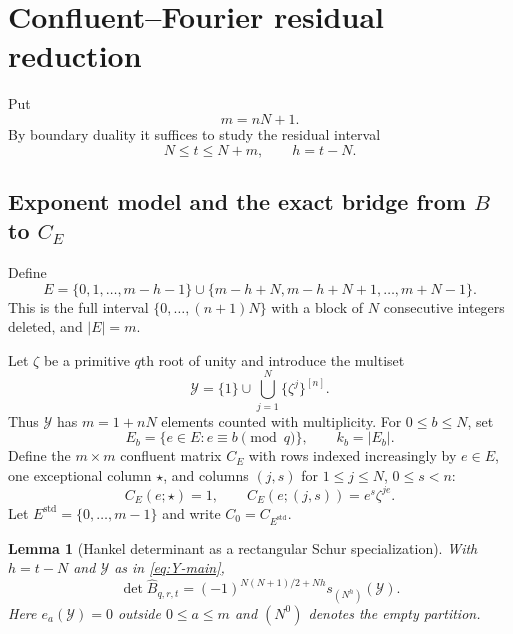 \documentclass[11pt]{amsart}
\newcommand{\cB}{\widehat B}
\newcommand{\1}{\mathbf 1}
\newtheorem{lemma}[theorem]{Lemma}
\theoremstyle{remark}
\begin{document}
\section{Confluent--Fourier residual reduction}
\label{sec:residual}

Put
\[
 m=nN+1.
\]
By boundary duality it suffices to study the residual interval
\begin{equation}\label{eq:residual-interval}
 N\le t\le N+m,
 \qquad h=t-N.
\end{equation}

\subsection{Exponent model and the exact bridge from $B$ to $C_E$}
Define
\begin{equation}\label{eq:E-main}
 E=\{0,1,\ldots,m-h-1\}\cup
 \{m-h+N,m-h+N+1,\ldots,m+N-1\}.
\end{equation}
This is the full interval $\{0,\ldots,(n+1)N\}$ with a block of $N$ consecutive integers deleted, and $|E|=m$.

Let $\zeta$ be a primitive $q$th root of unity and introduce the multiset
\begin{equation}\label{eq:Y-main}
 \mathcal Y=\{1\}\cup\bigcup_{j=1}^{N}\{\zeta^j\}^{[n]}.
\end{equation}
Thus $\mathcal Y$ has $m=1+nN$ elements counted with multiplicity. For $0\le b\le N$, set
\[
 E_b=\{e\in E:e\equiv b\pmod q\},\qquad k_b=|E_b|.
\]
Define the $m\times m$ confluent matrix $C_E$ with rows indexed increasingly by $e\in E$, one exceptional column $\star$, and columns $(j,s)$ for $1\le j\le N$, $0\le s<n$:
\begin{equation}\label{eq:CE-main}
 C_E(e;\star)=1,\qquad C_E(e;(j,s))=e^s\zeta^{je}.
\end{equation}
Let $E^{\mathrm{std}}=\{0,\ldots,m-1\}$ and write $C_0=C_{E^{\mathrm{std}}}$.

\begin{lemma}[Hankel determinant as a rectangular Schur specialization]\label{lem:B-Schur-main}
With $h=t-N$ and $\mathcal Y$ as in \eqref{eq:Y-main},
\begin{equation}\label{eq:B-Schur-main}
 \det \cB_{q,r,t}
 =(-1)^{N(N+1)/2+Nh}s_{(N^h)}(\mathcal Y).
\end{equation}
Here $e_a(\mathcal Y)=0$ outside $0\le a\le m$ and $(N^0)$ denotes the empty partition.
\end{lemma}
\end{document}
